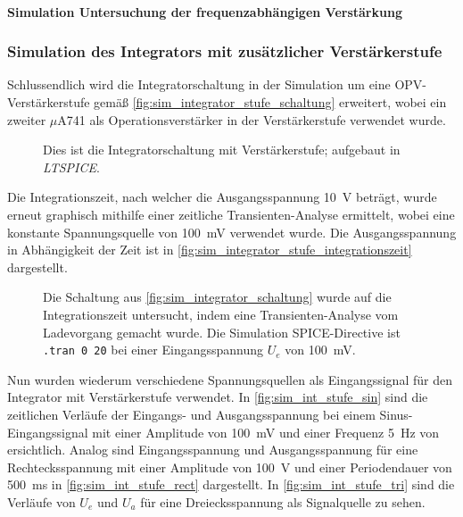 \documentclass[12pt,english,ngerman]{scrartcl}
\begin{document}
\paragraph{Simulation Untersuchung der frequenzabhängigen Verstärkung}

\subsubsection{Simulation des Integrators mit zusätzlicher Verstärkerstufe}

Schlussendlich wird die Integratorschaltung in der Simulation um eine
OPV-Verstärkerstufe gemäß \autoref{fig:sim_integrator_stufe_schaltung}
erweitert, wobei ein zweiter $\mu$A741 als Operationsverstärker in der
Verstärkerstufe verwendet wurde.

\begin{figure}[H]
  \centering
  \caption{Dies ist die Integratorschaltung mit Verstärkerstufe; aufgebaut in \textit{LTSPICE}.}
  \label{fig:sim_integrator_stufe_schaltung}
\end{figure}

Die Integrationszeit, nach welcher die Ausgangsspannung \SI{10}{\volt} beträgt,
wurde erneut graphisch mithilfe einer zeitliche Transienten-Analyse ermittelt,
wobei eine konstante Spannungsquelle von \SI{100}{\milli\volt} verwendet wurde.
Die Ausgangsspannung in Abhängigkeit der Zeit ist in
\autoref{fig:sim_integrator_stufe_integrationszeit} dargestellt.

\begin{figure}[H]
  \centering
  \caption{Die Schaltung aus \autoref{fig:sim_integrator_schaltung} wurde auf
  die Integrationszeit untersucht, indem eine Transienten-Analyse vom
  Ladevorgang gemacht wurde. Die Simulation SPICE-Directive ist \texttt{.tran 0 20} 
  bei einer Eingangsspannung $U_e$ von \SI{100}{\milli\volt}.}
  \label{fig:sim_integrator_stufe_integrationszeit}
\end{figure}

Nun wurden wiederum verschiedene Spannungsquellen als Eingangssignal für den
Integrator mit Verstärkerstufe verwendet. In \autoref{fig:sim_int_stufe_sin}
sind die zeitlichen Verläufe der Eingangs- und Ausgangsspannung bei einem
Sinus-Eingangssignal mit einer Amplitude von \SI{100}{\milli\volt} und einer
Frequenz \SI{5}{\hertz} von ersichtlich. Analog sind Eingangsspannung und
Ausgangsspannung für eine Rechtecksspannung mit einer Amplitude von
\SI{100}{\volt} und einer Periodendauer von \SI{500}{\milli\second} in
\autoref{fig:sim_int_stufe_rect} dargestellt. In
\autoref{fig:sim_int_stufe_tri} sind die Verläufe von $U_e$ und $U_a$ für eine
Dreiecksspannung als Signalquelle zu sehen.
\end{document}

